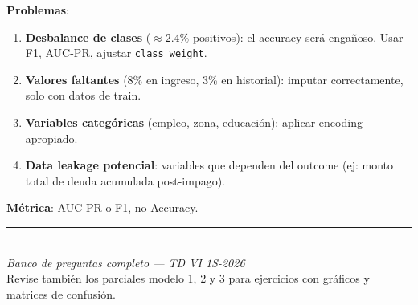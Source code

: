 \documentclass[11pt,a4paper]{article}
\begin{document}
\begin{enumerate}[label=\textbf{P\arabic*.}, resume]
\begin{answerbox}
\textbf{Problemas}:
\begin{enumerate}[label=\arabic*., topsep=2pt, itemsep=2pt]
  \item \textbf{Desbalance de clases} ($\approx 2.4\%$ positivos): el accuracy ser\'a
    enga\~noso. Usar F1, AUC-PR, ajustar \texttt{class\_weight}.
  \item \textbf{Valores faltantes} (8\% en ingreso, 3\% en historial): imputar
    correctamente, solo con datos de train.
  \item \textbf{Variables categ\'oricas} (empleo, zona, educaci\'on): aplicar encoding
    apropiado.
  \item \textbf{Data leakage potencial}: variables que dependen del outcome (ej: monto
    total de deuda acumulada post-impago).
\end{enumerate}
\textbf{M\'etrica}: AUC-PR o F1, no Accuracy.
\end{answerbox}

\end{enumerate}

\vspace{1cm}
\begin{center}
\rule{0.8\linewidth}{1pt}\\[6pt]
{\itshape Banco de preguntas completo --- TD VI 1S-2026}\\[4pt]
{\small\color{gray} Revise tambi\'en los parciales modelo 1, 2 y 3 para ejercicios con
gr\'aficos y matrices de confusi\'on.}
\end{center}
\end{document}

